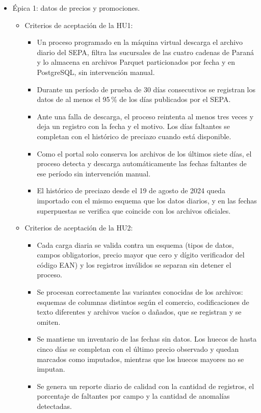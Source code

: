 \documentclass[
11pt, %
]{charter}
\begin{document}
\begin{itemize}
	\item Épica 1: datos de precios y promociones.
	\begin{itemize}
		\item Criterios de aceptación de la HU1:
		\begin{itemize}
			\item Un proceso programado en la máquina virtual descarga el archivo diario del SEPA, filtra las sucursales de las cuatro cadenas de Paraná y lo almacena en archivos Parquet particionados por fecha y en PostgreSQL, sin intervención manual.
			\item Durante un período de prueba de 30 días consecutivos se registran los datos de al menos el 95\,\% de los días publicados por el SEPA.
			\item Ante una falla de descarga, el proceso reintenta al menos tres veces y deja un registro con la fecha y el motivo. Los días faltantes se completan con el histórico de preciazo cuando está disponible.
			\item Como el portal solo conserva los archivos de los últimos siete días, el proceso detecta y descarga automáticamente las fechas faltantes de ese período sin intervención manual.
			\item El histórico de preciazo desde el 19 de agosto de 2024 queda importado con el mismo esquema que los datos diarios, y en las fechas superpuestas se verifica que coincide con los archivos oficiales.
		\end{itemize}
		\item Criterios de aceptación de la HU2:
		\begin{itemize}
			\item Cada carga diaria se valida contra un esquema (tipos de datos, campos obligatorios, precio mayor que cero y dígito verificador del código EAN) y los registros inválidos se separan sin detener el proceso.
			\item Se procesan correctamente las variantes conocidas de los archivos: esquemas de columnas distintos según el comercio, codificaciones de texto diferentes y archivos vacíos o dañados, que se registran y se omiten.
			\item Se mantiene un inventario de las fechas sin datos. Los huecos de hasta cinco días se completan con el último precio observado y quedan marcados como imputados, mientras que los huecos mayores no se imputan.
			\item Se genera un reporte diario de calidad con la cantidad de registros, el porcentaje de faltantes por campo y la cantidad de anomalías detectadas.

\end{itemize}
\end{itemize}
\end{itemize}
\end{document}
